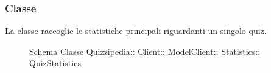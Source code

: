 \subsubsection{Classe }
La classe raccoglie le statistiche principali riguardanti un singolo quiz.
\begin{figure}[H]
\centering
\noindent{}
\caption[Schema Classe QuizStatistics]{Schema Classe Quizzipedia:: Client:: ModelClient:: Statistics:: QuizStatistics}
\end{figure}
